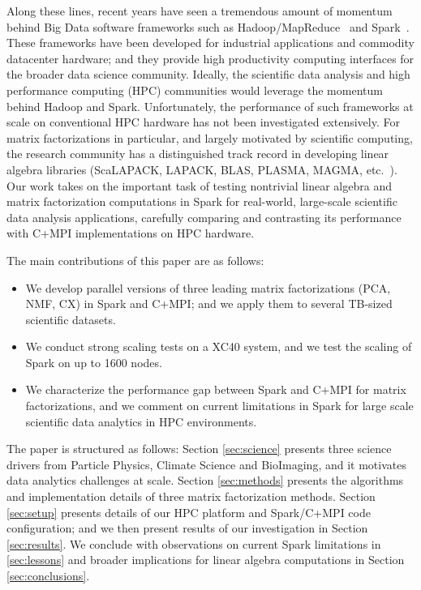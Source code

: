 Along these lines, recent years have seen a tremendous amount of momentum behind Big Data software frameworks such as Hadoop/MapReduce~\cite{DG04} and Spark~\cite{SPARK_HOTC_10}. 
These frameworks have been developed for industrial applications and commodity datacenter hardware; and they provide high productivity computing interfaces for the broader data science community.  
Ideally, the scientific data analysis and high performance computing (HPC) communities would leverage the momentum behind Hadoop and Spark.
Unfortunately, the performance of such frameworks at scale on conventional HPC hardware has not been investigated extensively. 
For matrix factorizations in particular, and largely motivated by scientific computing, the research community has a distinguished track record in developing linear algebra libraries (ScaLAPACK, LAPACK, BLAS, PLASMA, MAGMA, etc.~\cite{lapack99,PlasmaMagma2009}). 
Our work takes on the important task of testing nontrivial linear algebra and matrix factorization computations in Spark for real-world, large-scale scientific data analysis applications, carefully comparing and contrasting its performance with C+MPI implementations on HPC hardware. 

The main contributions of this paper are as follows:
\begin{itemize}
\item{We develop parallel versions of three leading matrix factorizations (PCA, NMF, CX) in Spark and C+MPI; and we apply them to several TB-sized scientific datasets.}
\item{We conduct strong scaling tests on a XC40 system, and we test the scaling of Spark on up to 1600 nodes.}
\item{We characterize the performance gap between Spark and C+MPI for matrix factorizations, and we comment on current limitations in Spark for large scale scientific data analytics in HPC environments.}
\end{itemize}

The paper is structured as follows: Section \ref{sec:science} presents three science drivers from Particle Physics, Climate Science and BioImaging, and it motivates data analytics challenges at scale. Section \ref{sec:methods} presents the algorithms and implementation details of three matrix factorization methods. Section \ref{sec:setup} presents details of our HPC platform and Spark/C+MPI code configuration; and we then present results of our investigation in Section \ref{sec:results}. We conclude with observations on current Spark limitations in \ref{sec:lessons} and broader implications for linear algebra computations in Section \ref{sec:conclusions}. 